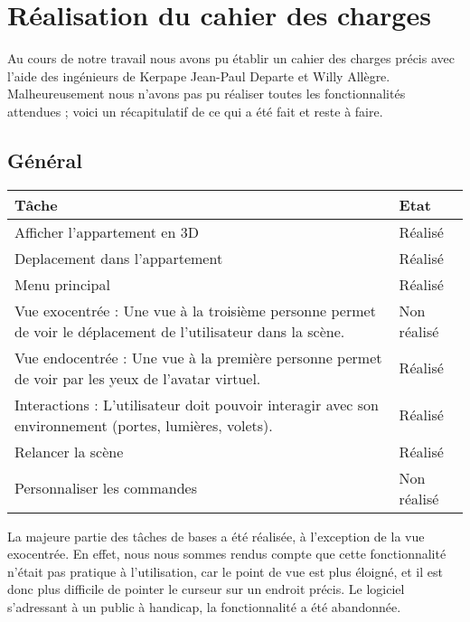 \section{Réalisation du cahier des charges}
Au cours de notre travail nous avons pu établir un cahier des charges précis avec l'aide des ingénieurs de Kerpape Jean-Paul Departe et Willy Allègre. Malheureusement nous n'avons pas pu réaliser toutes les fonctionnalités attendues ; voici un récapitulatif de ce qui a été fait et reste à faire. 

\subsection{Général}
\begin{tabular}{|p{}|p{}|}
	\hline
 	\textbf{Tâche} & \textbf{Etat} \\ \hline
	Afficher l'appartement en 3D & Réalisé \\ \hline
	Deplacement dans l'appartement & Réalisé \\ \hline
	Menu principal & Réalisé \\ \hline
	Vue exocentrée : Une vue à la troisième personne permet de voir le déplacement de l'utilisateur dans la scène. & Non réalisé \\ \hline
	Vue endocentrée : Une vue à la première personne permet de voir par les yeux de l'avatar  virtuel. & Réalisé \\ \hline
	Interactions : L'utilisateur doit pouvoir interagir avec son environnement (portes, lumières, volets). & Réalisé \\ \hline
	Relancer la scène & Réalisé \\ \hline
	Personnaliser les commandes & Non réalisé \\ \hline
\end{tabular}


La majeure partie des tâches de bases a été réalisée, à l'exception de la vue exocentrée. 
En effet, nous nous sommes rendus compte que cette fonctionnalité n'était pas pratique à l'utilisation, car le point de vue est plus éloigné, et il est donc plus difficile de pointer le curseur sur un endroit précis.
Le logiciel s'adressant à un public à handicap, la fonctionnalité a été abandonnée.
	
